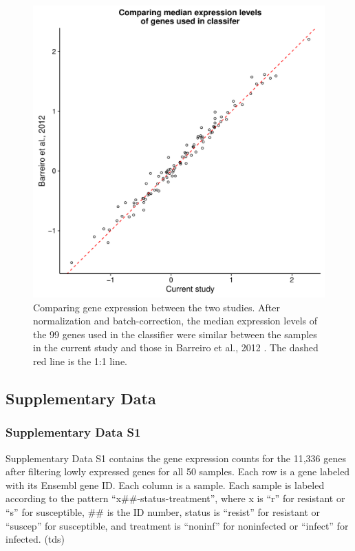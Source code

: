 \documentclass[fleqn,10pt]{wlscirep}
\begin{document}
\begin{figure}[ht]
\centering
\includegraphics[width=\linewidth]{../figure/classifier-exp.pdf}
\caption{
Comparing gene expression between the two studies. After normalization
and batch-correction, the median expression levels of the 99 genes
used in the classifier were similar between the samples in the current
study and those in Barreiro et al., 2012 \cite{Barreiro2012}. The
dashed red line is the 1:1 line.
}
\label{fig:class-exp}
\end{figure}

\clearpage\newpage
\subsection*{Supplementary Data}

\subsubsection*{Supplementary Data S1}

Supplementary Data S1 contains the gene expression counts for the
11,336 genes after filtering lowly expressed genes for all 50 samples.
Each row is a gene labeled with its Ensembl gene ID. Each column is a
sample. Each sample is labeled according to the pattern
“x\#\#-status-treatment”, where x is “r” for resistant or “s” for
susceptible, \#\# is the ID number, status is “resist” for resistant
or “suscep” for susceptible, and treatment is “noninf” for noninfected
or “infect” for infected. (tds)
\end{document}
